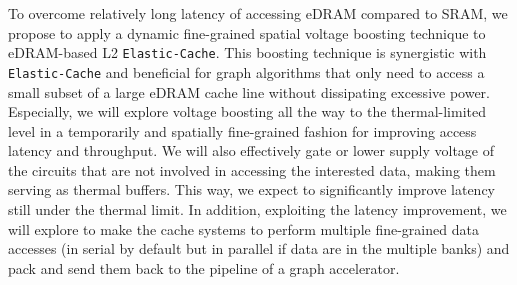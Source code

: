 To overcome relatively long latency of accessing eDRAM compared to SRAM, we propose to apply a dynamic fine-grained spatial voltage boosting technique to eDRAM-based L2 \texttt{Elastic-Cache}. 
This boosting technique is synergistic with \texttt{Elastic-Cache} and beneficial for graph algorithms that only need to access a small subset of a large eDRAM cache line without dissipating excessive power.
Especially, we will explore voltage boosting all the way to the thermal-limited level in a temporarily and spatially fine-grained fashion for improving access latency and throughput. 
We will also effectively gate or lower supply voltage of the circuits that are not involved in accessing the interested data, making them serving as thermal buffers. 
This way, we expect to significantly improve latency still under the thermal limit. 
In addition, exploiting the latency improvement, we will explore to make the cache systems to perform multiple fine-grained data accesses (in serial by default but in parallel if data are in the multiple banks) and pack and send them back to the pipeline of a graph accelerator. 


